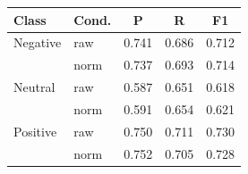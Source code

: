 \begin{tabular}{llccc}
\toprule
Class & Cond. & P & R & F1\\
\midrule
Negative & raw & 0.741 & 0.686 & 0.712\\
 & norm & 0.737 & 0.693 & 0.714\\
Neutral & raw & 0.587 & 0.651 & 0.618\\
 & norm & 0.591 & 0.654 & 0.621\\
Positive & raw & 0.750 & 0.711 & 0.730\\
 & norm & 0.752 & 0.705 & 0.728\\
\bottomrule
\end{tabular}
